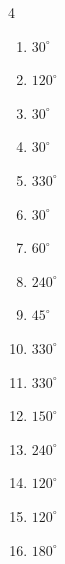 \begin{multicols}{4}
\begin{enumerate}
  \item $\displaystyle 30^{\circ}$

  \item $\displaystyle 120^{\circ}$

  \item $\displaystyle 30^{\circ}$

  \item $\displaystyle 30^{\circ}$

  \item $\displaystyle 330^{\circ}$

  \item $\displaystyle 30^{\circ}$

  \item $\displaystyle 60^{\circ}$

  \item $\displaystyle 240^{\circ}$

  \item $\displaystyle 45^{\circ}$

  \item $\displaystyle 330^{\circ}$

  \item $\displaystyle 330^{\circ}$

  \item $\displaystyle 150^{\circ}$

  \item $\displaystyle 240^{\circ}$

  \item $\displaystyle 120^{\circ}$

  \item $\displaystyle 120^{\circ}$

  \item $\displaystyle 180^{\circ}$
        \phantom{$\displaystyle =\pi$}


\end{enumerate}
\end{multicols}
